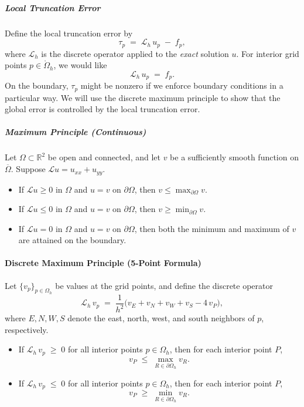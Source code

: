 \subparagraph{Local Truncation Error}
Define the local truncation error by
\[
  \tau_p \;=\; \mathcal{L}_h\,u_p \;-\; f_p,
\]
where \(\mathcal{L}_h\) is the discrete operator applied to the \emph{exact} solution \(u\). For interior grid points \(p\in \mathring{\Omega}_h\), we would like
\[
  \mathcal{L}_h\,u_p \;=\; f_p.
\]
On the boundary, \(\tau_p\) might be nonzero if we enforce boundary conditions in a particular way. We will use the discrete maximum principle to show that the global error is controlled by the local truncation error.

\subparagraph{Maximum Principle (Continuous)}
Let \(\Omega \subset \mathbb{R}^2\) be open and connected, and let \(v\) be a sufficiently smooth function on \(\overline{\Omega}\). Suppose \(\mathcal{L}u = u_{xx} + u_{yy}\).

\begin{itemize}
  \item If \(\mathcal{L}u \ge 0\) in \(\Omega\) and \(u = v\) on \(\partial\Omega\), then \(v \le \max_{\partial\Omega} v\).
  \item If \(\mathcal{L}u \le 0\) in \(\Omega\) and \(u = v\) on \(\partial\Omega\), then \(v \ge \min_{\partial\Omega} v\).
  \item If \(\mathcal{L}u = 0\) in \(\Omega\) and \(u = v\) on \(\partial\Omega\), then both the minimum and maximum of \(v\) are attained on the boundary.
\end{itemize}

\paragraph{Discrete Maximum Principle (5-Point Formula)}
Let \(\{v_p\}_{p \in \Omega_h}\) be values at the grid points, and define the discrete operator
\[
  \mathcal{L}_h\,v_p
  \;=\;
  \frac{1}{h^2}\bigl(v_E + v_N + v_W + v_S - 4\,v_P\bigr),
\]
where \(E, N, W, S\) denote the east, north, west, and south neighbors of \(p\), respectively.

\begin{itemize}
  \item If \(\mathcal{L}_h\,v_p \;\ge\; 0\) for all interior points \(p \in \Omega_h\), then for each interior point \(P\),
        \[
          v_P \;\le\; \max_{R \in \partial\Omega_h} v_R.
        \]
  \item If \(\mathcal{L}_h\,v_p \;\le\; 0\) for all interior points \(p \in \Omega_h\), then for each interior point \(P\),
        \[
          v_P \;\ge\; \min_{R \in \partial\Omega_h} v_R.
        \]
\end{itemize}

